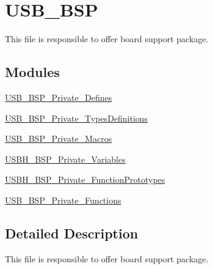 \hypertarget{group__USB__BSP}{\section{U\-S\-B\-\_\-\-B\-S\-P}
\label{group__USB__BSP}
}


This file is responsible to offer board support package.  


\subsection*{Modules}
\begin{DoxyCompactItemize}
\item 
\hyperlink{group__USB__BSP__Private__Defines}{U\-S\-B\-\_\-\-B\-S\-P\-\_\-\-Private\-\_\-\-Defines}
\item 
\hyperlink{group__USB__BSP__Private__TypesDefinitions}{U\-S\-B\-\_\-\-B\-S\-P\-\_\-\-Private\-\_\-\-Types\-Definitions}
\item 
\hyperlink{group__USB__BSP__Private__Macros}{U\-S\-B\-\_\-\-B\-S\-P\-\_\-\-Private\-\_\-\-Macros}
\item 
\hyperlink{group__USBH__BSP__Private__Variables}{U\-S\-B\-H\-\_\-\-B\-S\-P\-\_\-\-Private\-\_\-\-Variables}
\item 
\hyperlink{group__USBH__BSP__Private__FunctionPrototypes}{U\-S\-B\-H\-\_\-\-B\-S\-P\-\_\-\-Private\-\_\-\-Function\-Prototypes}
\item 
\hyperlink{group__USB__BSP__Private__Functions}{U\-S\-B\-\_\-\-B\-S\-P\-\_\-\-Private\-\_\-\-Functions}
\end{DoxyCompactItemize}


\subsection{Detailed Description}
This file is responsible to offer board support package. 
